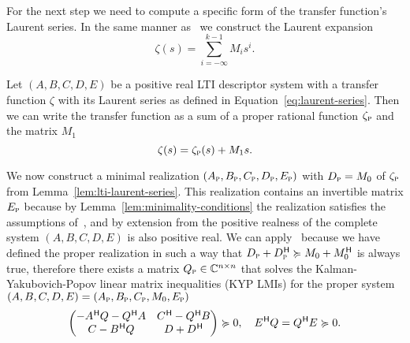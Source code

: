 For the next step we need to compute a specific form of the transfer function's Laurent series.
In the same manner as~\cite[Equation~(37)]{CGH2022} we construct the Laurent expansion
\begin{equation}\label{eq:laurent-series}
    \zeta(s) = \sum\limits_{i = -\infty}^{k - 1} M_i s^i.
\end{equation}


\begin{lemma}\label{lem:lti-laurent-series}
    Let $(A, B, C, D, E)$ be a positive real \ac{LTI} descriptor system with a transfer function $\zeta$ with its Laurent series as defined in Equation~\eqref{eq:laurent-series}.
    Then we can write the transfer function as a sum of a proper rational function $\zeta_{\textnormal{\scshape p}}$ and the matrix $M_1$
    \begin{equation}\label{eq:pr-lti-laurent-series}
        \zeta(s) = \zeta_{\textnormal{\scshape p}}(s) + M_1 s.
    \end{equation}
\end{lemma}

We now construct a minimal realization $(A_{\textnormal{\scshape p}}, B_{\textnormal{\scshape p}}, C_{\textnormal{\scshape p}}, D_{\textnormal{\scshape p}}, E_{\textnormal{\scshape p}})$ with $D_{\textnormal{\scshape p}} = M_0$ of $\zeta_{\textnormal{\scshape p}}$ from Lemma~\ref{lem:lti-laurent-series}.
This realization contains an invertible matrix $E_{\textnormal{\scshape p}}$ because by Lemma~\ref{lem:minimality-conditions} the realization satisfies the assumptions of~\cite[Theorem~6.3]{Freund2004}, and by extension from the positive realness of the complete system $(A, B, C, D, E)$ is also positive real.
We can apply~\cite[Proposition~5.4]{CGH2022} because we have defined the proper realization in such a way that $D_{\textnormal{\scshape p}} + D_{\textnormal{\scshape p}}^{\mkern1mu \mathsf{H}} \succcurlyeq M_0 + M_0^{\mkern1mu \mathsf{H}}$ is always true, therefore there exists a matrix $Q_{\textnormal{\scshape p}} \in \mathbb{C}^{n \times n}$ that solves the Kalman-Yakubovich-Popov linear matrix inequalities (KYP LMIs) for the proper system $(A, B, C, D, E) = (A_{\textnormal{\scshape p}}, B_{\textnormal{\scshape p}}, C_{\textnormal{\scshape p}}, M_0, E_{\textnormal{\scshape p}})$
\begin{equation}\label{eq:kyp-lmi}
    \begin{pmatrix}
        -A^{\mkern1mu \mathsf{H}} Q - Q^{\mkern1mu \mathsf{H}} A & C^{\mkern1mu \mathsf{H}} - Q^{\mkern1mu \mathsf{H}} B \\
        C - B^{\mkern1mu \mathsf{H}} Q & D + D^{\mkern1mu \mathsf{H}}
    \end{pmatrix} \succcurlyeq 0,\quad E^{\mkern1mu \mathsf{H}} Q = Q^{\mkern1mu \mathsf{H}} E \succcurlyeq 0.
\end{equation}

